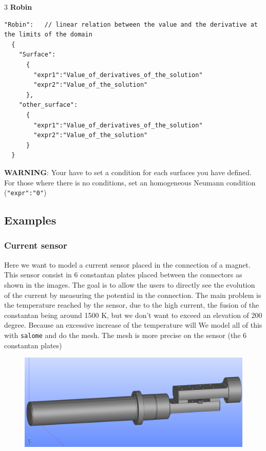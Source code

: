 \documentclass[11pt]{amsart}
\newcommand{\admonition}[2]{\textbf{#1}: {#2}}
\begin{document}
3 \textbf{Robin}


\begin{verbatim}
"Robin":   // linear relation between the value and the derivative at the limits of the domain
  {
    "Surface":
      {
        "expr1":"Value_of_derivatives_of_the_solution"
        "expr2":"Value_of_the_solution"
      },
    "other_surface":
      {
        "expr1":"Value_of_derivatives_of_the_solution"
        "expr2":"Value_of_the_solution"
      }
  }
\end{verbatim}

\admonition{WARNING}{Your have to set a condition for each surfaces you have defined.
For those where there is no conditions, set an homogeneous Neumann condition (\texttt{"expr":"0"})}
\hypertarget{x-examples}{\subsection{Examples}}
\hypertarget{x-current-sensor}{\subsubsection{Current sensor}}
Here we want to model a current sensor placed in the connection of a magnet.
This sensor consist in 6 constantan plates placed between the connectors as shown in the images.
The goal is to allow the users to directly see the evolution of the current by measuring the potential in the connection.
The main problem is the temperature reached by the sensor, due to the high current, the fusion of the constantan being around 1500 K, but we don’t want to exceed an elevation of 200 degree.
Because an excessive increase of the temperature will
We model all of this with \texttt{salome} and do the mesh.
The mesh is more precise on the sensor (the 6 constantan plates)


\begin{figure}
\centering\includegraphics[width=4.75truein]{./images/learning/thermoelectric/Ensemble_CapteurCourant.png}


\end{figure}
\end{document}
